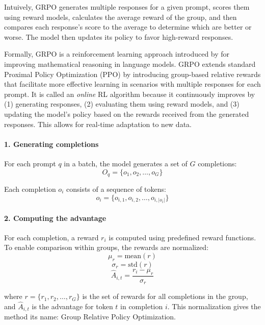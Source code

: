 Intuively, GRPO generates multiple responses for a given prompt, scores them using reward models, calculates the average reward of the group, and then compares each response's score to the average to determine which are better or worse. The model then updates its policy to favor high-reward responses.

Formally, GRPO is a reinforcement learning approach introduced by \citet{DeepSeek-AIDEEPSEEKR12025} for improving mathematical reasoning in language models. GRPO extends standard Proximal Policy Optimization (PPO) by introducing group-based relative rewards that facilitate more effective learning in scenarios with multiple responses for each prompt. It is called an \textit{online} RL algorithm because it continuously improves by (1) generating responses, (2) evaluating them using reward models, and (3) updating the model's policy based on the rewards received from the generated responses. This allows for real-time adaptation to new data.

\paragraph{1. Generating completions} For each prompt $q$ in a batch, the model generates a set of $G$ completions:
\begin{equation}
O_q = \{o_1, o_2, \ldots, o_G\}
\end{equation}

Each completion $o_i$ consists of a sequence of tokens:
\begin{equation}
o_i = \{o_{i,1}, o_{i,2}, \ldots, o_{i,|o_i|}\}
\end{equation}

\paragraph{2. Computing the advantage} For each completion, a reward $r_i$ is computed using predefined reward functions. To enable comparison within groups, the rewards are normalized:
\begin{equation}
\mu_r = \text{mean}(r)
\end{equation}
\begin{equation}
\sigma_r = \text{std}(r)
\end{equation}
\begin{equation}
\hat{A}_{i,t} = \frac{r_i - \mu_r}{\sigma_r}
\end{equation}

where $r = \{r_1, r_2, \ldots, r_G\}$ is the set of rewards for all completions in the group, and $\hat{A}_{i,t}$ is the advantage for token $t$ in completion $i$. This normalization gives the method its name: Group Relative Policy Optimization.

